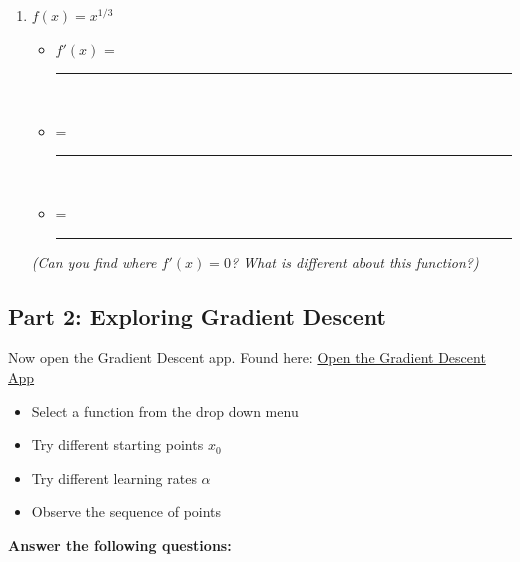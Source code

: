 \documentclass[11pt]{article}
\begin{document}
\begin{enumerate}
\begin{itemize}
    \end{itemize}

    \item $f(x) = x^{1/3}$ \\
        \begin{itemize}
        \item $f'(x)$ = \rule{5cm}{0.4pt} \\
        \vspace{2cm}
        
        \item {} = \rule{5cm}{0.4pt} \\
        \vspace{2cm}

        \item {} = \rule{5cm}{0.4pt} 
        \vspace{2cm}
        
    \end{itemize}
    \textit{(Can you find where $f'(x) = 0$? What is different about this function?)}
\end{enumerate}

\subsection*{Part 2: Exploring Gradient Descent}

Now open the Gradient Descent app. Found here: \href{https://woodword0-gradientdescentapplication.hf.space/}{Open the Gradient Descent App}


\begin{itemize}
    \item Select a function from the drop down menu
    \item Try different starting points $x_0$
    \item Try different learning rates $\alpha$
    \item Observe the sequence of points
\end{itemize}

\textbf{Answer the following questions:}
\end{document}
